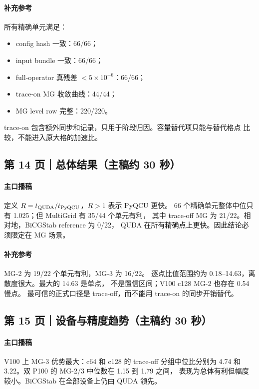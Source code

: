 \documentclass[UTF8,a4paper,11pt,fontset=none]{ctexart}
\begin{document}
\paragraph{补充参考}
所有精确单元满足：
\begin{itemize}
  \item config hash 一致：66/66；
  \item input bundle 一致：66/66；
  \item full-operator 真残差 \(<5\times10^{-6}\)：66/66；
  \item trace-on MG 收敛曲线：44/44；
  \item MG level row 完整：220/220。
\end{itemize}
trace-on 包含额外同步和记录，只用于阶段归因。容量替代项只能与替代格点
比较，不能进入原大格的加速比。

\subsection{第 14 页｜总体结果（主稿约 30 秒）}

\paragraph{主口播稿}
定义 \(R=t_{\rm QUDA}/t_{\rm PyQCU}\)，\(R>1\) 表示 PyQCU 更快。
66 个精确单元整体中位只有 1.025；但 MultiGrid 有 35/44 个单元有利，
其中 trace-off MG 为 21/22。相对地，BiCGStab reference 为 0/22，
QUDA 在所有精确点上更快。因此结论必须限定在 MG 场景。

\paragraph{补充参考}
MG-2 为 19/22 个单元有利，MG-3 为 16/22。
逐点比值范围约为 0.18--14.63，离散度很大。最大的 14.63 是单点，
不是置信区间；V100 c128 MG-2 也存在 0.54 慢点。
最可信的正式口径是 trace-off，而不能用 trace-on 的同步开销替代。

\subsection{第 15 页｜设备与精度趋势（主稿约 30 秒）}

\paragraph{主口播稿}
V100 上 MG-3 优势最大：c64 和 c128 的 trace-off 分组中位比分别为
4.74 和 3.22。双 P100 的 MG-2/3 中位数在 1.15 到 1.79 之间，
表现为总体有利但幅度较小。BiCGStab 在全部设备上仍由 QUDA 领先。
\end{document}
